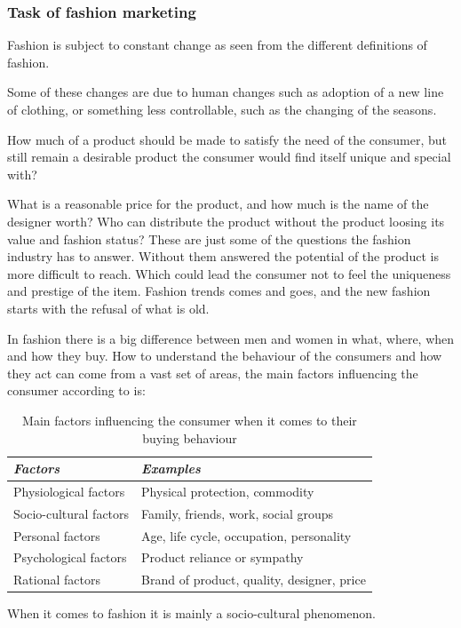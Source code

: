 \subsubsection{Task of fashion marketing}
  Fashion is subject to constant change as seen from the different definitions of
  fashion.

  Some of these changes are due to human changes such as adoption of a new line
  of clothing, or something less controllable, such as the changing of the
  seasons.

  How much of a product should be made to satisfy the need of the consumer, but
  still remain a desirable product the consumer would find itself unique and
  special with?

  What is a reasonable price for the product, and how much is the name of the
  designer worth?  Who can distribute the product without the product loosing its
  value and fashion status?  These are just some of the questions the fashion
  industry has to answer.  Without them answered the potential of the product
  is more difficult to reach.  Which could lead the consumer not to feel the uniqueness and
  prestige of the item.  Fashion trends comes and goes, and the new fashion
  starts with the refusal of what is old.

  In fashion there is a big difference between men and women in what, where, when
  and how they buy.  How to understand the behaviour of the consumers and how they
  act can come from a vast set of areas, the main factors influencing the
  consumer according to \cite{kotler2009marketing} is:

  \begin{table}[H]
      \centering
      \begin{tabular}{l l}
      \toprule
        \emph{Factors}        & \emph{Examples} \\ \midrule
        Physiological factors   & Physical protection, commodity \\ 
        Socio-cultural factors  & Family, friends, work, social groups  \\ 
        Personal factors        & Age, life cycle, occupation, personality \\ 
        Psychological factors   & Product reliance or sympathy \\  %
        Rational factors        & Brand of product, quality, designer, price \\
      \bottomrule
      \end{tabular}
      \caption[Fashion Factors]{Main factors influencing the consumer when it comes to their buying behaviour}
      \label{table:FashionFactors}
  \end{table}
  When it comes to fashion it is mainly a socio-cultural phenomenon.

